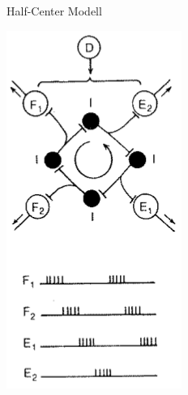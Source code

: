 \begin{figure}[h!]
\begin{subfigure}{.2\textwidth}
		\caption{Half-Center Modell}
		\label{HC}
	\end{subfigure}
	\begin{subfigure}{.2\textwidth}
		\includegraphics[width=\textwidth]{figures/ch05_ClosedLoop.png}

\end{subfigure}
\end{figure}
